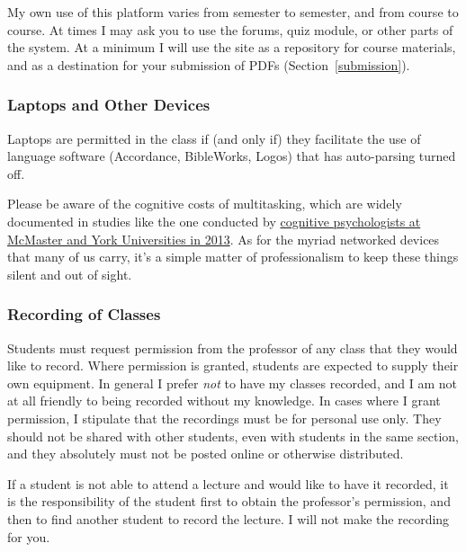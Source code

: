 My own use of this platform varies from semester to semester, and from
course to course. At times I may ask you to use the forums, quiz module, or
other parts of the system. At a minimum I will use the site as a repository
for course materials, and as a destination for your submission of PDFs
(Section~\ref{submission}).

\subsubsection{Laptops and Other Devices}
\label{laptops}

Laptops are permitted in the class if (and only if) they facilitate the
use of language software (Accordance, BibleWorks, Logos) that has
auto-parsing turned off.

Please be aware of the cognitive costs of multitasking, which are widely
documented in studies like the one conducted by
\href{http://dx.doi.org/10.1016/j.compedu.2012.10.003}{cognitive
psychologists at McMaster and York Universities in 2013}. As for the
myriad networked devices that many of us carry, it's a simple matter of
professionalism to keep these things silent and out of sight.

\subsubsection{Recording of Classes}
\label{recording}

Students must request permission from the professor of any class that they
would like to record. Where permission is granted, students are expected to
supply their own equipment. In general I prefer \emph{not} to have my classes
recorded, and I am not at all friendly to being recorded without my knowledge.
In cases where I grant permission, I stipulate that the recordings must be for
personal use only. They should not be shared with other students, even with
students in the same section, and they absolutely must not be posted online or
otherwise distributed.

If a student is not able to attend a lecture and would like to have it recorded,
it is the responsibility of the student first to obtain the professor's
permission, and then to find another student to record the lecture. I will not
make the recording for you.